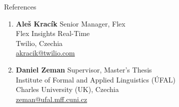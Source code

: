 \documentclass{resume}
\begin{document}
\begin{rSection}{References}

    \begin{enumerate}
        \item \textbf{Ale\v{s} Krac\'{i}k} \hfill Senior Manager, Flex\\
            Flex Insights Real-Time\\
            Twilio, Czechia\\
            \faEnvelope \hspace{0.5mm} \href{mailto:akracik@twilio.com}{akracik@twilio.com}

        \item \textbf{Daniel Zeman} \hfill Supervisor, Master's Thesis\\
            Institute of Formal and Applied Linguistics ({\'U}FAL)\\
            Charles University (UK), Czechia\\
            \faEnvelope \hspace{0.5mm} \href{mailto:zeman@ufal.mff.cuni.cz}{zeman@ufal.mff.cuni.cz}
    \end{enumerate}

\end{rSection}
\end{document}
